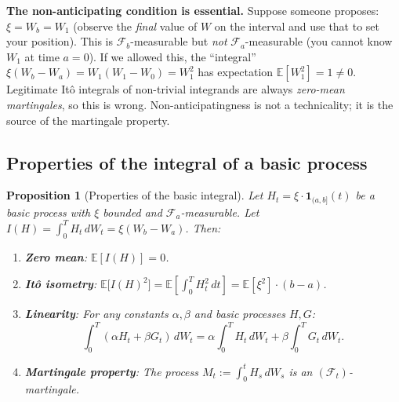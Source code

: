 \documentclass[11pt,a4paper]{article}
\theoremstyle{definition}
\theoremstyle{plain}
\newtheorem{proposition}{Proposition}[section]
\theoremstyle{remark}
\newcommand{\E}{\mathbb{E}}
\newcommand{\F}{\mathcal{F}}
\begin{document}
\begin{pitfall}
\textbf{The non-anticipating condition is essential.}
Suppose someone proposes: $\xi = W_b = W_1$ (observe the \emph{final} value of $W$ on the interval and use that to set your position). This is $\F_b$-measurable but \emph{not} $\F_a$-measurable (you cannot know $W_1$ at time $a = 0$). If we allowed this, the ``integral'' $\xi(W_b - W_a) = W_1(W_1 - W_0) = W_1^2$ has expectation $\E[W_1^2] = 1 \neq 0$. Legitimate Itô integrals of non-trivial integrands are always \emph{zero-mean martingales}, so this is wrong. Non-anticipatingness is not a technicality; it is the source of the martingale property.
\end{pitfall}

\subsection{Properties of the integral of a basic process}

\begin{proposition}[Properties of the basic integral]
\label{prop:basic-props}
Let $H_t = \xi \cdot \mathbf{1}_{(a,b]}(t)$ be a basic process with $\xi$ bounded and $\F_a$-measurable. Let $I(H) = \int_0^T H_t\,dW_t = \xi(W_b - W_a)$. Then:

\begin{enumerate}[label=(\roman*)]
  \item \textbf{Zero mean}: $\E[I(H)] = 0$.
  \item \textbf{Itô isometry}: $\E\bigl[I(H)^2\bigr] = \E\left[\int_0^T H_t^2\,dt\right] = \E[\xi^2]\cdot(b-a)$.
  \item \textbf{Linearity}: For any constants $\alpha, \beta$ and basic processes $H, G$:
  \[
    \int_0^T (\alpha H_t + \beta G_t)\,dW_t = \alpha\int_0^T H_t\,dW_t + \beta\int_0^T G_t\,dW_t.
  \]
  \item \textbf{Martingale property}: The process $M_t := \int_0^t H_s\,dW_s$ is an $(\F_t)$-martingale.
\end{enumerate}
\end{proposition}
\end{document}
